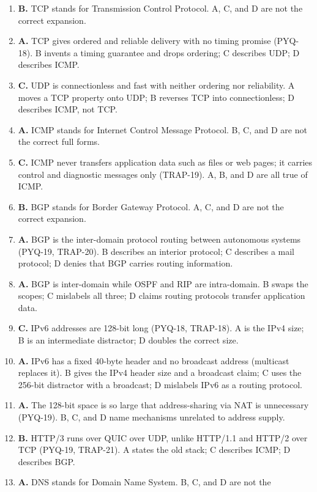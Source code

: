 \begin{enumerate}[label=\textbf{Q\arabic*.}, leftmargin=*]
\item \textbf{B.} TCP stands for Transmission Control Protocol. A, C, and D
  are not the correct expansion.
\item \textbf{A.} TCP gives ordered and reliable delivery with no timing
  promise (PYQ-18). B invents a timing guarantee and drops ordering; C
  describes UDP; D describes ICMP.
\item \textbf{C.} UDP is connectionless and fast with neither ordering nor
  reliability. A moves a TCP property onto UDP; B reverses TCP into
  connectionless; D describes ICMP, not TCP.
\item \textbf{A.} ICMP stands for Internet Control Message Protocol. B, C,
  and D are not the correct full forms.
\item \textbf{C.} ICMP never transfers application data such as files or web
  pages; it carries control and diagnostic messages only (TRAP-19). A, B,
  and D are all true of ICMP.
\item \textbf{B.} BGP stands for Border Gateway Protocol. A, C, and D are not
  the correct expansion.
\item \textbf{A.} BGP is the inter-domain protocol routing between autonomous
  systems (PYQ-19, TRAP-20). B describes an interior protocol; C describes a
  mail protocol; D denies that BGP carries routing information.
\item \textbf{A.} BGP is inter-domain while OSPF and RIP are intra-domain.
  B swaps the scopes; C mislabels all three; D claims routing protocols
  transfer application data.
\item \textbf{C.} IPv6 addresses are 128-bit long (PYQ-18, TRAP-18). A is the
  IPv4 size; B is an intermediate distractor; D doubles the correct size.
\item \textbf{A.} IPv6 has a fixed 40-byte header and no broadcast address
  (multicast replaces it). B gives the IPv4 header size and a broadcast
  claim; C uses the 256-bit distractor with a broadcast; D mislabels IPv6 as
  a routing protocol.
\item \textbf{A.} The 128-bit space is so large that address-sharing via NAT
  is unnecessary (PYQ-19). B, C, and D name mechanisms unrelated to address
  supply.
\item \textbf{B.} HTTP/3 runs over QUIC over UDP, unlike HTTP/1.1 and HTTP/2
  over TCP (PYQ-19, TRAP-21). A states the old stack; C describes ICMP; D
  describes BGP.
\item \textbf{A.} DNS stands for Domain Name System. B, C, and D are not the

\end{enumerate}
